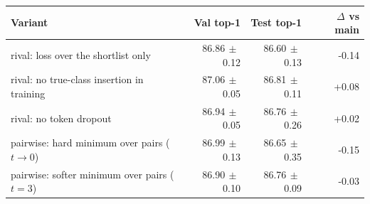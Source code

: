 \begin{tabular}{lrrr}
\toprule
Variant & Val top-1 & Test top-1 & $\Delta$ vs main \\
\midrule
rival: loss over the shortlist only & 86.86{\scriptsize$\,\pm\,$0.12} & 86.60{\scriptsize$\,\pm\,$0.13} & -0.14 \\
rival: no true-class insertion in training & 87.06{\scriptsize$\,\pm\,$0.05} & 86.81{\scriptsize$\,\pm\,$0.11} & +0.08 \\
rival: no token dropout & 86.94{\scriptsize$\,\pm\,$0.05} & 86.76{\scriptsize$\,\pm\,$0.26} & +0.02 \\
pairwise: hard minimum over pairs ($t \to 0$) & 86.99{\scriptsize$\,\pm\,$0.13} & 86.65{\scriptsize$\,\pm\,$0.35} & -0.15 \\
pairwise: softer minimum over pairs ($t = 3$) & 86.90{\scriptsize$\,\pm\,$0.10} & 86.76{\scriptsize$\,\pm\,$0.09} & -0.03 \\
\bottomrule
\end{tabular}
